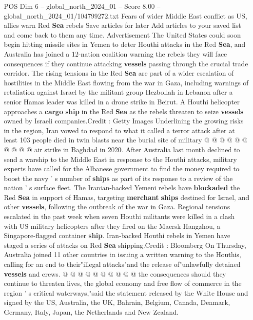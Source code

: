 \begin{textsample}{POS Dim 6 – global\_north\_2024\_01 – Score 8.00 – global\_north\_2024\_01/104799272.txt}  \label{ex:f6_pos_114}
Fears of wider Middle East conflict as US, allies warn Red \textbf{Sea} rebels Save articles for later Add articles to your saved list and come back to them any time.
Advertisement The United States could soon begin hitting missile sites in Yemen to deter Houthi attacks in the Red \textbf{Sea}, and Australia has joined a 12-nation coalition warning the rebels they will face consequences if they continue attacking \textbf{vessels} passing through the crucial trade corridor.
The rising tensions in the Red \textbf{Sea} are part of a wider escalation of hostilities in the Middle East flowing from the war in Gaza, including warnings of retaliation against Israel by the militant group Hezbollah in Lebanon after a senior Hamas leader was killed in a drone strike in Beirut.
A Houthi helicopter approaches a \textbf{cargo} \textbf{ship} in the Red \textbf{Sea} as the rebels threaten to seize \textbf{vessels} owned by Israeli companies.Credit : Getty Images Underlining the growing risks in the region, Iran vowed to respond to what it called a terror attack after at least 103 people died in twin blasts near the burial site of military @ @ @ @ @ @ @ @ @ @ air strike in Baghdad in 2020.
After Australia last month declined to send a warship to the Middle East in response to the Houthi attacks, military experts have called for the Albanese government to find the money required to boost the navy ' s number of \textbf{ships} as part of its response to a review of the nation ' s surface fleet.
The Iranian-backed Yemeni rebels have \textbf{blockaded} the Red \textbf{Sea} in support of Hamas, targeting \textbf{merchant} \textbf{ships} destined for Israel, and other \textbf{vessels}, following the outbreak of the war in Gaza.
Regional tensions escalated in the past week when seven Houthi militants were killed in a clash with US military helicopters after they fired on the Maersk Hangzhou, a Singapore-flagged container \textbf{ship}.
Iran-backed Houthi rebels in Yemen have staged a series of attacks on Red \textbf{Sea} shipping.Credit : Bloomberg On Thursday, Australia joined 11 other countries in issuing a written warning to the Houthis, calling for an end to their"illegal attacks"and the release of"unlawfully detained \textbf{vessels} and crews. @ @ @ @ @ @ @ @ @ @ the consequences should they continue to threaten lives, the global economy and free flow of commerce in the region ' s critical waterways,"said the statement released by the White House and signed by the US, Australia, the UK, Bahrain, Belgium, Canada, Denmark, Germany, Italy, Japan, the Netherlands and New Zealand.

\end{textsample}
